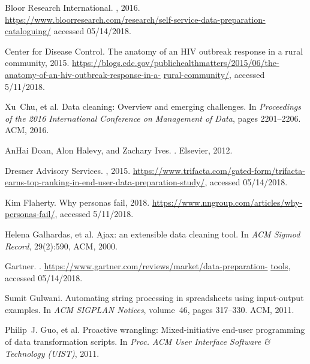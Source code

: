 \documentclass[11pt]{article}
\begin{document}
\itemsep=1pt 
\begin{small}
\begin{thebibliography}{10}

{Bloor Research International}.
, 2016.
\newblock
  \url{https://www.bloorresearch.com/research/self-service-data-preparation-cataloguing/}
  accessed 05/14/2018.

{Center for Disease Control}.
\newblock The anatomy of an {HIV} outbreak response in a rural community, 2015.
\newblock
  \url{https://blogs.cdc.gov/publichealthmatters/2015/06/the-anatomy-of-an-hiv-outbreak-response-in-a-} \url{rural-community/},
  accessed 5/11/2018.

Xu~Chu, et al. %
\newblock Data cleaning: Overview and emerging challenges.
\newblock In {\em Proceedings of the 2016 International Conference on
  Management of Data}, pages 2201--2206. ACM, 2016.

AnHai Doan, Alon Halevy, and Zachary Ives.
.
\newblock Elsevier, 2012.

{Dresner Advisory Services}.
, 2015.
\newblock
  \url{https://www.trifacta.com/gated-form/trifacta-earns-top-ranking-in-end-user-data-preparation-study/},
  accessed 05/14/2018.

Kim Flaherty.
\newblock Why personas fail, 2018.
\newblock \url{https://www.nngroup.com/articles/why-personas-fail/}, accessed
  5/11/2018.

Helena Galhardas, et al. %
\newblock Ajax: an extensible data cleaning tool.
\newblock In {\em ACM Sigmod Record}, 29(2):590, ACM, 2000.

{Gartner}.
.
\newblock \url{https://www.gartner.com/reviews/market/data-preparation-} \url{tools},
  accessed 05/14/2018.

Sumit Gulwani.
\newblock Automating string processing in spreadsheets using input-output
  examples.
\newblock In {\em ACM SIGPLAN Notices}, volume~46, pages 317--330. ACM, 2011.

Philip~J. Guo, et al. %
\newblock Proactive wrangling: Mixed-initiative end-user programming of data
  transformation scripts.
\newblock In {\em Proc. ACM User Interface Software \& Technology (UIST)},
  2011.


\end{thebibliography}
\end{small}
\end{document}
